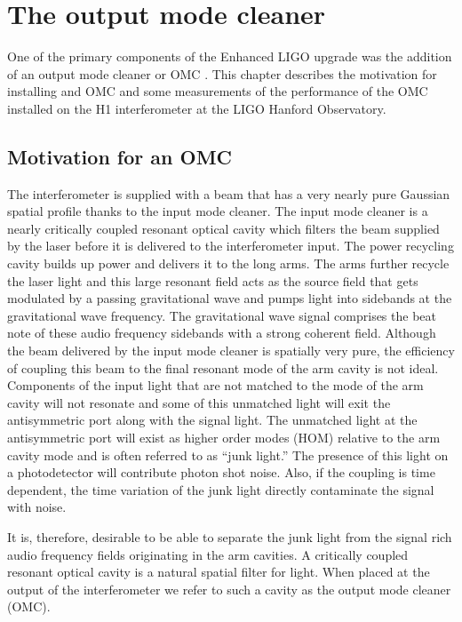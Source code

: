 \chapter{The output mode cleaner}
\label{ch:omc}
One of the primary components of the Enhanced LIGO upgrade was the addition of an output mode cleaner or OMC \cite{T060156}. %
This chapter describes the motivation for installing and OMC and some measurements of the performance of the OMC installed on the H1 interferometer at the LIGO Hanford Observatory.

\section{Motivation for an OMC}
The interferometer is supplied with a beam that has a very nearly pure Gaussian spatial profile thanks to the input mode cleaner. %
The input mode cleaner is a nearly critically coupled resonant optical cavity which filters the beam supplied by the laser before it is delivered to the interferometer input. %
The power recycling cavity builds up power and delivers it to the long arms. %
The arms further recycle the laser light and this large resonant field acts as the source field that gets modulated by a passing gravitational wave and pumps light into sidebands at the gravitational wave frequency. %
The gravitational wave signal comprises the beat note of these audio frequency sidebands with a strong coherent field. %
Although the beam delivered by the input mode cleaner is spatially very pure, the efficiency of coupling this beam to the final resonant mode of the arm cavity is not ideal. %
Components of the input light that are not matched to the mode of the arm cavity will not resonate and some of this unmatched light will exit the antisymmetric port along with the signal light. %
The unmatched light at the antisymmetric port will exist as higher order modes (HOM) relative to the arm cavity mode and is often referred to as ``junk light.'' %
The presence of this light on a photodetector will contribute photon shot noise. %
Also, if the coupling is time dependent, the time variation of the junk light directly contaminate the signal with noise.

It is, therefore, desirable to be able to separate the junk light from the signal rich audio frequency fields originating in the arm cavities. %
A critically coupled resonant optical cavity is a natural spatial filter for light. %
When placed at the output of the interferometer we refer to such a cavity as the output mode cleaner (OMC).

